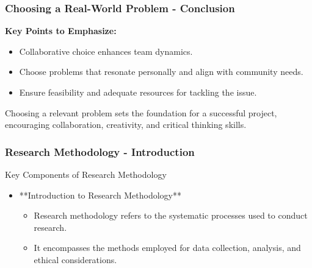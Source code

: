 \documentclass[aspectratio=169]{beamer}
\begin{document}
\begin{frame}[fragile]
    \frametitle{Choosing a Real-World Problem - Conclusion}
    \textbf{Key Points to Emphasize:}
    \begin{itemize}
        \item Collaborative choice enhances team dynamics.
        \item Choose problems that resonate personally and align with community needs.
        \item Ensure feasibility and adequate resources for tackling the issue.
    \end{itemize}
    
    Choosing a relevant problem sets the foundation for a successful project, encouraging collaboration, creativity, and critical thinking skills.
\end{frame}

\begin{frame}[fragile]
    \frametitle{Research Methodology - Introduction}
    \begin{block}{Key Components of Research Methodology}
        \begin{itemize}
            \item **Introduction to Research Methodology**
            \begin{itemize}
                \item Research methodology refers to the systematic processes used to conduct research. 
                \item It encompasses the methods employed for data collection, analysis, and ethical considerations.
            \end{itemize}
        \end{itemize}
    \end{block}
\end{frame}
\end{document}
